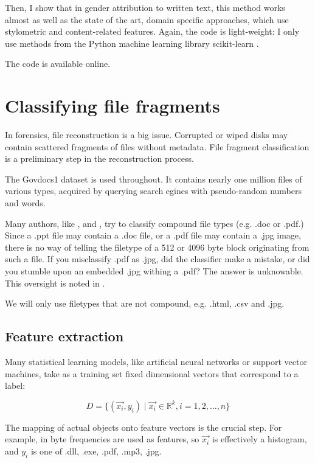 Then, I show that in gender attribution to written text, this method works almost as well as the state of the art, domain specific approaches, which use stylometric and content-related features.  Again, the code is light-weight: I only use methods from the Python machine learning library scikit-learn \cite{Pedregosa2011}.

The code \cite{ClassificationGithub} is available online.

\section{Classifying file fragments}

In forensics, file reconstruction is a big issue. Corrupted or wiped disks
may contain scattered fragments of files without metadata. File fragment
classification is a preliminary step in the reconstruction process.

The Govdocs1 dataset \cite{Garfinkel2009} is used throughout. It contains
nearly one million files of various types, acquired by querying search
egines with pseudo-random numbers and words.

Many authors, like \cite{Li2010}, \cite{Veenman2007} and
\cite{Axelsson2010}, try to classify compound file types (e.g. .doc or
.pdf.) Since a .ppt file may contain a .doc file, or a .pdf file may
contain a .jpg image, there is no way of telling the filetype of a 512 or
4096 byte block originating from such a file. If you misclassify .pdf as .jpg, did the classifier make a mistake, or did you stumble upon an embedded .jpg withing a .pdf? The answer is unknowable. This oversight is noted in \cite{Roussev2013}.

We will only use filetypes that are not compound, e.g. .html, .csv and
.jpg.

\subsection{Feature extraction}

Many statistical learning models, like artificial neural networks or
support vector machines, take as a training set fixed dimensional
vectors that correspond to a label:

\begin{equation}
  D = \{ (\vec{x_{i}}, y_{i}) \mid \vec{x_{i}} \in \mathbb{R}^{k}, i = 1, 2, \dots, n \}
\end{equation}

The mapping of actual objects onto feature vectors is the crucial step.
For example, in \cite{Li2010} byte frequencies are used as features, so
$\vec{x_{i}}$ is effectively a histogram, and $y_{i}$ is one of .dll,
.exe, .pdf, .mp3, .jpg.

